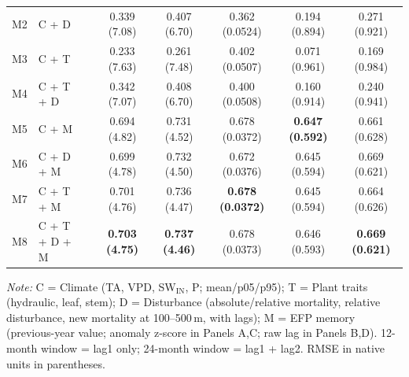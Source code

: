 \begin{table}[htbp]
\begin{tabular}{llcccccc}
M2 & C + D &  & 0.339 (7.08) & 0.407 (6.70) & 0.362 (0.0524) & 0.194 (0.894) & 0.271 (0.921) \\
M3 & C + T &  & 0.233 (7.63) & 0.261 (7.48) & 0.402 (0.0507) & 0.071 (0.961) & 0.169 (0.984) \\
M4 & C + T + D &  & 0.342 (7.07) & 0.408 (6.70) & 0.400 (0.0508) & 0.160 (0.914) & 0.240 (0.941) \\
M5 & C + M &  & 0.694 (4.82) & 0.731 (4.52) & 0.678 (0.0372) & \textbf{0.647 (0.592)} & 0.661 (0.628) \\
M6 & C + D + M &  & 0.699 (4.78) & 0.732 (4.50) & 0.672 (0.0376) & 0.645 (0.594) & 0.669 (0.621) \\
M7 & C + T + M &  & 0.701 (4.76) & 0.736 (4.47) & \textbf{0.678 (0.0372)} & 0.645 (0.594) & 0.664 (0.626) \\
M8 & C + T + D + M &  & \textbf{0.703 (4.75)} & \textbf{0.737 (4.46)} & 0.678 (0.0373) & 0.646 (0.593) & \textbf{0.669 (0.621)} \\
\midrule
\bottomrule
\end{tabular}
\vspace{2pt}
\begin{minipage}{\linewidth}
\footnotesize
\textit{Note:} C = Climate (TA, VPD, SW$_\mathrm{IN}$, P; mean/p05/p95); T = Plant traits (hydraulic, leaf, stem); D = Disturbance (absolute/relative mortality, relative disturbance, new mortality at 100--500\,m, with lags); M = EFP memory (previous-year value; anomaly z-score in Panels A,C; raw lag in Panels B,D). 12-month window = lag1 only; 24-month window = lag1 + lag2. RMSE in native units in parentheses.
\end{minipage}
\end{table}

